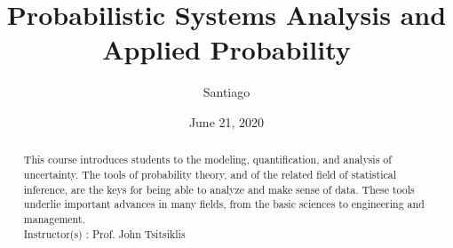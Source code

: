 \documentclass[12pt]{article}   %
\begin{document}
\title{Probabilistic Systems Analysis and Applied Probability}
\author{Santiago}
\date{June 21, 2020}

\maketitle %

\begin{abstract}
	This course introduces students to the modeling, quantification, and analysis of uncertainty.  The tools of probability theory, and of the related field of statistical inference, are the keys for being able to analyze and make sense of data. These tools underlie important advances in many fields, from the basic sciences to engineering and management. \\
	Instructor(s) : Prof. John Tsitsiklis

\end{abstract}



\end{document}
